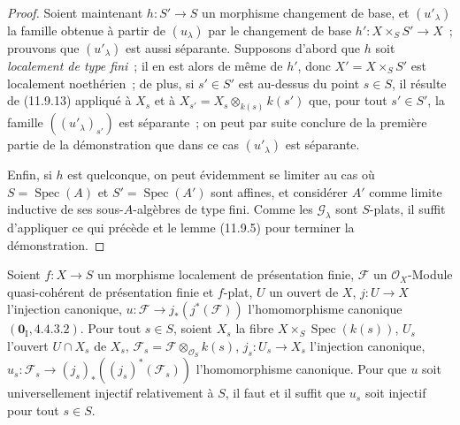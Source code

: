 \begin{proof}
Soient maintenant $h:S'\to S$ un morphisme changement de base, et
$(u'_\lambda)$ la famille obtenue à partir de $(u_\lambda)$ par le changement
de base $h':X\times_S S'\to X$~; prouvons que $(u'_\lambda)$ est aussi
séparante. Supposons d'abord que $h$ soit \emph{localement de type fini}~; il
en est alors de même de $h'$, donc $X'=X\times_S S'$ est localement
noethérien~; de plus, si $s'\in S'$ est au-dessus du point $s\in S$, il résulte
de (11.9.13) appliqué à $X_s$ et à
$X_{s'}=X_s\otimes_{k(s)}k(s')$ que, pour tout $s'\in S'$, la famille
$((u'_\lambda)_{s'})$ est séparante~; on peut par suite conclure de la première
partie de la démonstration que dans ce cas $(u'_\lambda)$ est séparante.

Enfin, si $h$ est quelconque, on peut évidemment se limiter au cas où
$S=\operatorname{Spec}(A)$ et $S'=\operatorname{Spec}(A')$ sont affines, et
considérer $A'$ comme limite inductive de ses sous-$A$-algèbres de type fini.
Comme les $\mathcal G_\lambda$ sont $S$-plats, il suffit d'appliquer ce qui
précède et le lemme (11.9.5) pour terminer la démonstration.
\end{proof}

\begin{proposition}[11.9.17]
\label{IV.11.9.17-fr}
Soient $f:X\to S$ un morphisme localement de présentation finie, $\mathcal F$
un $\mathcal O_X$-Module quasi-cohérent de présentation finie et $f$-plat,
$U$ un ouvert de $X$, $j:U\to X$ l'injection canonique,
$u:\mathcal F\to j_*(j^*(\mathcal F))$ l'homomorphisme canonique
$(\mathbf 0_{\mathrm I},4.4.3.2)$. Pour tout $s\in S$, soient $X_s$ la fibre
$X\times_S\operatorname{Spec}(k(s))$, $U_s$ l'ouvert $U\cap X_s$ de $X_s$,
$\mathcal F_s=\mathcal F\otimes_{\mathcal O_S}k(s)$,
$j_s:U_s\to X_s$ l'injection canonique,
$u_s:\mathcal F_s\to(j_s)_*((j_s)^*(\mathcal F_s))$ l'homomorphisme
canonique. Pour que $u$ soit universellement injectif relativement à $S$, il
faut et il suffit que $u_s$ soit injectif pour tout $s\in S$.
\end{proposition}

